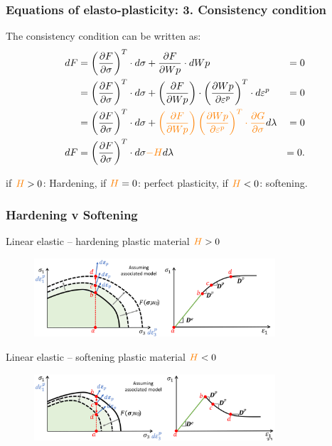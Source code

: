 \documentclass[notes]{beamer}
\begin{document}
\begin{frame}
\frametitle{Equations of elasto-plasticity: 3. Consistency condition}
The consistency condition can be written as:
	\begin{align*}
	dF & = \left(\frac{\partial F}{\partial \sigma}\right)^T \cdot d \sigma + \frac{\partial F}{\partial Wp}\cdot dWp & = 0 \\
	 & = \left(\frac{\partial F}{\partial \sigma}\right)^T \cdot d \sigma + \left(\frac{\partial F}{\partial Wp}\right)\cdot \left(\frac{\partial Wp}{\partial \varepsilon^p}\right)^T\cdot d \varepsilon^p & = 0 \\
	 & = \left(\frac{\partial F}{\partial \sigma}\right)^T \cdot d \sigma + \textcolor{orange}{\left(\frac{\partial F}{\partial Wp}\right)\left(\frac{\partial Wp}{\partial \varepsilon^p}\right)^T\cdot\frac{\partial G}{\partial 	\sigma}} d\lambda  & = 0 \\
	dF & = \left(\frac{\partial F}{\partial \sigma}\right)^T \cdot d \sigma \textcolor{orange}{-H} d\lambda & = 0.
	\end{align*}

	if $\textcolor{orange}{H} > 0$: Hardening, if $\textcolor{orange}{H} = 0$: perfect plasticity, if $\textcolor{orange}{H} < 0$: softening.
\end{frame}


\begin{frame}
\frametitle{Hardening v Softening}
Linear elastic – hardening plastic material  $\textcolor{orange}{H} > 0$
\begin{figure}
	\includegraphics[width=0.8\textwidth]{figs/hardening-plastic.png}
\end{figure}
Linear elastic – softening plastic material  $\textcolor{orange}{H} < 0$
\begin{figure}
	\includegraphics[width=0.8\textwidth]{figs/softening-plastic.png}
\end{figure}
\end{frame}
\end{document}
